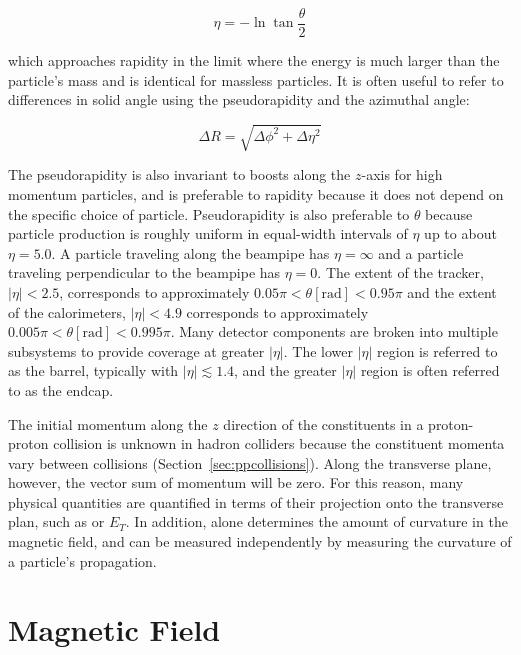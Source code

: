 \begin{equation}\label{eq:pseudorapidity}
\eta = - \ln \tan \frac{\theta}{2}
\end{equation}

\noindent which approaches rapidity in the limit where the energy is much larger than the particle's mass and is identical for massless particles.
It is often useful to refer to differences in solid angle using the pseudorapidity and the azimuthal angle:

\begin{equation}\label{eq:deltar}
\Delta R = \sqrt{\Delta \phi^2 + \Delta \eta^2}
\end{equation}


The pseudorapidity is also invariant to boosts along the $z$-axis for high momentum particles, and is preferable to rapidity because it does not depend on the specific choice of particle.
Pseudorapidity is also preferable to $\theta$ because particle production is roughly uniform in equal-width intervals of $\eta$ up to about $\eta = 5.0$. 
A particle traveling along the beampipe has $\eta = \infty$ and a particle traveling perpendicular to the beampipe has $\eta = 0$.
The extent of the tracker, $|\eta| < 2.5$, corresponds to approximately $0.05 \pi < \theta [\mathrm{rad}] < 0.95 \pi$ and the extent of the calorimeters, $|\eta| < 4.9$ corresponds to approximately $0.005 \pi < \theta [\mathrm{rad}] < 0.995 \pi$.
Many detector components are broken into multiple subsystems to provide coverage at greater $|\eta|$.
The lower $|\eta|$ region is referred to as the barrel, typically with $|\eta| \lesssim 1.4$, and the greater $|\eta|$ region is often referred to as the endcap.

The initial momentum along the $z$ direction of the constituents in a proton-proton collision is unknown in hadron colliders because the constituent momenta vary between collisions (Section~\ref{sec:ppcollisions}).
Along the transverse plane, however, the vector sum of momentum will be zero.
For this reason, many physical quantities are quantified in terms of their projection onto the transverse plan, such as \pt or $E_T$.
In addition, \pt alone determines the amount of curvature in the magnetic field, and can be measured independently by measuring the curvature of a particle's propagation.


\section{Magnetic Field}
\label{sec:magnetic_field}

